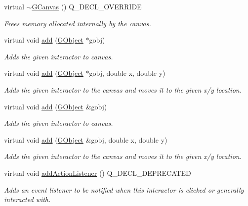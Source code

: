\begin{DoxyCompactItemize}
virtual \mbox{\hyperlink{classGCanvas_a601cc120704b2d2e9898a61f6ce94bc0}{$\sim$\+G\+Canvas}} () Q\+\_\+\+D\+E\+C\+L\+\_\+\+O\+V\+E\+R\+R\+I\+DE
\begin{DoxyCompactList}\small\item\em Frees memory allocated internally by the canvas. \end{DoxyCompactList}\item 
virtual void \mbox{\hyperlink{classGCanvas_afe8277e7b2627513c6f7452fb0b2847d}{add}} (\mbox{\hyperlink{classGObject}{G\+Object}} $\ast$gobj)
\begin{DoxyCompactList}\small\item\em Adds the given interactor to canvas. \end{DoxyCompactList}\item 
virtual void \mbox{\hyperlink{classGCanvas_a8bb36f245efc7806414a1339c2befa1c}{add}} (\mbox{\hyperlink{classGObject}{G\+Object}} $\ast$gobj, double x, double y)
\begin{DoxyCompactList}\small\item\em Adds the given interactor to the canvas and moves it to the given x/y location. \end{DoxyCompactList}\item 
virtual void \mbox{\hyperlink{classGCanvas_ac732fc2123d7a6d7e2de145fe9bbd8e8}{add}} (\mbox{\hyperlink{classGObject}{G\+Object}} \&gobj)
\begin{DoxyCompactList}\small\item\em Adds the given interactor to canvas. \end{DoxyCompactList}\item 
virtual void \mbox{\hyperlink{classGCanvas_a5b11b532869632a6c26b098b0858eac5}{add}} (\mbox{\hyperlink{classGObject}{G\+Object}} \&gobj, double x, double y)
\begin{DoxyCompactList}\small\item\em Adds the given interactor to the canvas and moves it to the given x/y location. \end{DoxyCompactList}\item 
virtual void \mbox{\hyperlink{classGInteractor_a02f20ea6edfa0671f31c4c648a253833}{add\+Action\+Listener}} () Q\+\_\+\+D\+E\+C\+L\+\_\+\+D\+E\+P\+R\+E\+C\+A\+T\+ED
\begin{DoxyCompactList}\small\item\em Adds an event listener to be notified when this interactor is clicked or generally interacted with. \end{DoxyCompactList}\item 

\end{DoxyCompactItemize}
